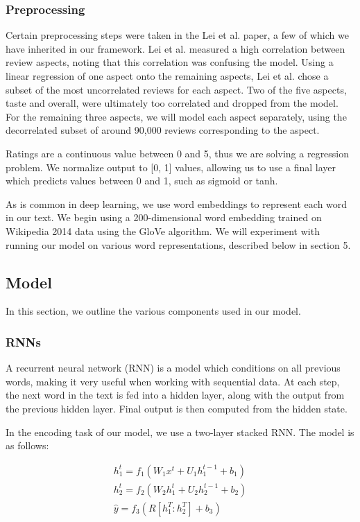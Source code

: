 \documentclass{article} %
\begin{document}
\subsubsection{Preprocessing}
Certain preprocessing steps were taken in the Lei et al. paper, a few of which we have inherited in our framework. Lei et al. measured a high correlation between review aspects, noting that this correlation was confusing the model. Using a linear regression of one aspect onto the remaining aspects, Lei et al. chose a subset of the most uncorrelated reviews for each aspect. Two of the five aspects, taste and overall, were ultimately too correlated and dropped from the model. For the remaining three aspects, we will model each aspect separately, using the decorrelated subset of around 90,000 reviews corresponding to the aspect. 

Ratings are a continuous value between 0 and 5, thus we are solving a regression problem. We normalize output to [0, 1] values, allowing us to use a final layer which predicts values between 0 and 1, such as sigmoid or tanh. 

As is common in deep learning, we use word embeddings to represent each word in our text. We begin using a 200-dimensional word embedding trained on Wikipedia 2014 data using the GloVe algorithm. We will experiment with running our model on various word representations, described below in section 5. 

\subsection{Model}

In this section, we outline the various components used in our model.
\subsubsection{RNNs}

A recurrent neural network (RNN) is a model which conditions on all previous words, making it very useful when working with sequential data. At each step, the next word in the text is fed into a hidden layer, along with the output from the previous hidden layer. Final output is then computed from the hidden state.

In the encoding task of our model, we use a two-layer stacked RNN. The model is as follows:

\begin{gather}
h_1^t = f_1(W_1 x^t + U_1 h_1^{t-1} + b_1) \\
h_2^t = f_2(W_2 h_1^t + U_2 h_2^{t-1} + b_2) \\
\hat{y} = f_3(R[h_1^T:h_2^T] + b_3)
\end{gather}
\end{document}
